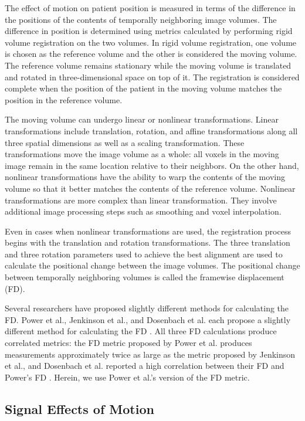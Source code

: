 The effect of motion on patient position is measured in terms of the difference in the positions of the contents of temporally neighboring image volumes. The difference in position is determined using metrics calculated by performing rigid volume registration on the two volumes. 
In rigid volume registration, one volume is chosen as the reference volume and the other is considered the moving volume. The reference volume remains stationary while the moving volume is translated and rotated in three-dimensional space on top of it. The registration is considered complete when the position of the patient in the moving volume matches the position in the reference volume. %

The moving volume can undergo linear or nonlinear transformations. Linear transformations include translation, rotation, and affine transformations along all three spatial dimensions as well as a scaling transformation. These transformations move the image volume as a whole: all voxels in the moving image remain in the same location relative to their neighbors. On the other hand, nonlinear transformations have the ability to warp the contents of the moving volume so that it better matches the contents of the reference volume. Nonlinear transformations are more complex than linear transformation. They involve additional image processing steps such as smoothing and voxel interpolation.

Even in cases when nonlinear transformations are used, the registration process begins with the translation and rotation transformations. The three translation and three rotation parameters used to achieve the best alignment are used to calculate the positional change between the image volumes. The positional change between temporally neighboring volumes is called the framewise displacement (FD).  

Several researchers have proposed slightly different methods for calculating the FD. Power et al., Jenkinson et al., and Dosenbach et al. each propose a slightly different method for calculating the FD \cite{Power2012} \cite{Jenkinson2002} \cite{Dosenbach2017}. All three FD calculations produce correlated metrics: the FD metric proposed by Power et al. produces measurements approximately twice as large as the metric proposed by Jenkinson et al., and Dosenbach et al. reported a high correlation between their FD and Power’s FD \cite{Yan2013a} \cite{Dosenbach2017}. Herein, we use Power et al.'s version of the FD metric.

\subsection{Signal Effects of Motion}

